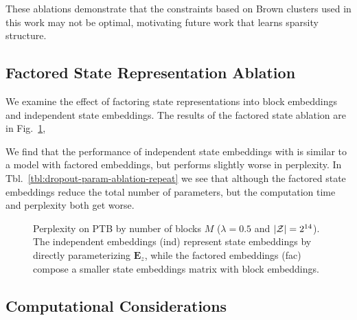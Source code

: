 \documentclass[11pt,a4paper]{article}
\begin{document}
These ablations demonstrate that the constraints based on
Brown clusters used in this work may not be optimal,
motivating future work that learns sparsity structure.

\subsection{Factored State Representation Ablation}
\label{sec:fac_ablation}
We examine the effect of factoring state representations into block embeddings
and independent state embeddings.
The results of the factored state ablation are in Fig.~\ref{fig:fac-ablation},

We find that the performance of independent state embeddings with
is similar to a model with factored embeddings,
but performs slightly worse in perplexity.
In Tbl.~\ref{tbl:dropout-param-ablation-repeat} we see that although the factored state embeddings reduce the total number of parameters, but the computation time and perplexity both get worse.

\begin{figure}[t]
\centering
{}
\caption{\label{fig:fac-ablation}
Perplexity on \textsc{PTB} by number of blocks $M$ ($\lambda =0.5$ and $|\mathcal{Z}|=2^{14}$).
The independent embeddings (ind) represent state embeddings by directly parameterizing $\mathbf{E}_z$, while the factored embeddings (fac) compose a smaller state embeddings matrix with block embeddings.
}
\end{figure}

\subsection{Computational Considerations}
\end{document}

